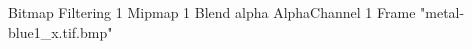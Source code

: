{Bitmap
	{Filtering 1}
	{Mipmap 1}
	{Blend alpha}
	{AlphaChannel 1}
	{Frame "metal-blue1_x.tif.bmp"}
}
